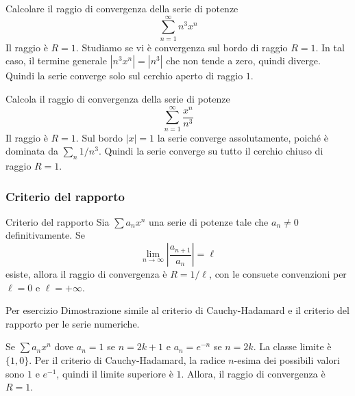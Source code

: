 \documentclass[a4paper]{article}
\begin{document}
\begin{radioactive}
\begin{snippetexample}{}
    Calcolare il raggio di convergenza della serie di potenze
    \[
        \sum_{n=1}^\infty n^3x^n
    \]
    Il raggio è \(R = 1\).
    Studiamo se vi è convergenza sul bordo di raggio \(R = 1\).
    In tal caso, il termine generale \(|n^3 x^n| = |n^3|\) che non tende a zero,
    quindi diverge.
    Quindi la serie converge solo sul cerchio aperto di raggio \(1\).
\end{snippetexample}
\end{radioactive}

\begin{radioactive}
\begin{snippetexample}{}
    Calcola il raggio di convergenza della serie di potenze
    \[
        \sum_{n=1}^\infty\frac{x^n}{n^3}
    \]
    Il raggio è \(R = 1\).
    Sul bordo \(|x|=1\) la serie converge assolutamente, poiché è dominata da \(\sum_n1/n^3\).
    Quindi la serie converge su tutto il cerchio chiuso di raggio \(R=1\).
\end{snippetexample}
\end{radioactive}

\subsubsection{Criterio del rapporto}

\begin{radioactive}
\begin{snippettheorem}{Criterio del rapporto}
    Sia \(\sum a_nx^n\)
    una serie di potenze tale che \(a_n \neq 0\) definitivamente.
    Se \[
        \lim_{n\to\infty}\left|\frac{a_{n+1}}{a_n}\right|=\ell
    \]
    esiste, allora il raggio di convergenza è \(R=1/\ell\), con le consuete
    convenzioni per \(\ell=0\) e \(\ell=+\infty\).
\end{snippettheorem}
\end{radioactive}

\begin{radioactive}
\begin{snippetproof}{Per esercizio}
    Dimostrazione simile al criterio di Cauchy-Hadamard e
    il criterio del rapporto per le serie numeriche.
\end{snippetproof}
\end{radioactive}

\begin{radioactive}
\begin{snippetexample}{}
    Se \(\sum a_n x^n\) dove \(a_n = 1\) se \(n = 2k+1\)
    e \(a_n = e^{-n}\) se \(n = 2k\).
    La classe limite è \(\{1, 0\}\).
    Per il criterio di Cauchy-Hadamard,
    la radice \(n\)-esima dei possibili valori sono \(1\) e \(e^{-1}\),
    quindi il limite superiore è \(1\).
    Allora, il raggio di convergenza è \(R=1\).
\end{snippetexample}
\end{radioactive}
\end{document}
